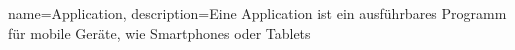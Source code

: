 

{
	name=Application,
	description={Eine Application ist ein ausführbares Programm für mobile Geräte, wie Smartphones oder Tablets}
}
